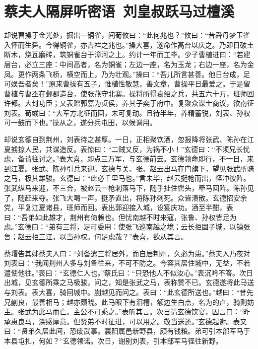 \chapter{蔡夫人隔屏听密语~刘皇叔跃马过檀溪}

却说曹操于金光处，掘出一铜雀，间荀攸曰：“此何兆也？”攸曰：“昔舜母梦玉雀入怀而生舜。今得铜雀，亦吉祥之兆也。”操大喜，遂命作高台以庆之。乃即日破土断木，烧瓦磨砖，筑铜雀台于漳河之上。约计一年而工毕。少子曹植进曰：“若建层台，必立三座：中间高者，名为铜雀；左边一座，名为玉龙；右边一座，名为金凤。更作两条飞桥，横空而上，乃为壮观。”操曰：“吾儿所言甚善。他日台成，足可娱吾者矣！”原来曹操有五子，惟植性敏慧，善文章，曹操平日最爱之。于是留曹植与曹丕在邺郡造台，使张燕守北寨。操将所得袁绍之兵，共五六十万，班师回许都。大封功臣；又表赠郭嘉为贞侯，养其子奕于府中。复聚众谋士商议，欲南征刘表。荀彧曰：“大军方北征而回，未可复动。且待半年，养精蓄锐，刘表、孙权可一鼓而下也。”操从之，遂分兵屯田，以候调用。

却说玄德自到荆州，刘表待之甚厚。一日，正相聚饮酒，忽报降将张武、陈孙在江夏掳掠人民，共谋造反。表惊曰：“二贼又反，为祸不小！”玄德曰：“不须兄长忧虑，备请往讨之。”表大喜，即点三万军，与玄德前去。玄德领命即行，不一日，来到江夏。张武、陈孙引兵来迎。玄德与关、张、赵云出马在门旗下，望见张武所骑之马，极其雄骏。玄德曰：“此必千里马也。”言未毕，赵云挺枪而出，径冲彼阵。张武纵马来迎，不三合，被赵云一枪刺落马下，随手扯住辔头，牵马回阵。陈孙见了，随赶来夺。张飞大喝一声，挺矛直出，将陈孙刺死。众皆溃散。玄德招安余党，平复江夏诸县，班师而回。表出郭迎接入城，设宴庆功。酒至半酣，表曰：“吾弟如此雄才，荆州有倚赖也。但忧南越不时来寇，张鲁、孙权皆足为虑。”玄德曰：“弟有三将，足可委用：使张飞巡南越之境；云长拒固子城，以镇张鲁；赵云拒三江，以当孙权。何足虑哉？”表喜，欲从其言。

蔡瑁告其姊蔡夫人曰：“刘备遣三将居外，而自居荆州，久必为患。”蔡夫人乃夜对刘表曰：“我闻荆州人多与刘备往来，不可不防之。今容其居住城中，无益，不若遣使他往。”表曰：“玄德仁人也。”蔡氏曰：“只恐他人不似汝心。”表沉吟不答。次日出城，见玄德所乘之马极骏，问之，知是张武之马，表称赞不已。玄德遂将此马送与刘表。表大喜，骑回城中。蒯越见而问之。表曰：“此玄德所送也。”越曰：“昔先兄蒯良，最善相马；越亦颇晓。此马眼下有泪槽，额边生白点，名为的卢，骑则妨主。张武为此马而亡。主公不可乘之。”表听其言。次日请玄德饮宴，因言曰：“昨承惠良马，深感厚意。但贤弟不时征进，可以用之。敬当送还。”玄德起谢。表又曰：“贤弟久居此间，恐废武事。襄阳属邑新野县，颇有钱粮。弟可引本部军马于本县屯扎，何如？”玄德领诺。次日，谢别刘表，引本部军马径往新野。

